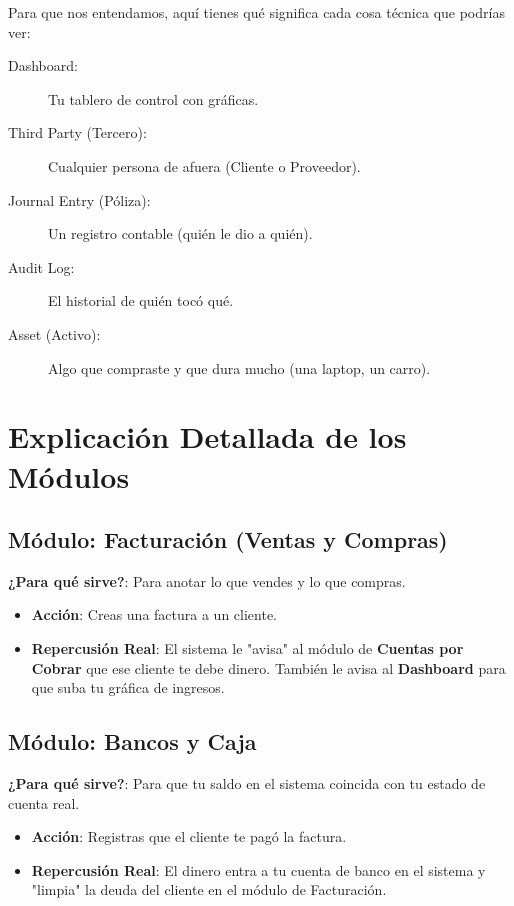 \documentclass[12pt, landscape, oneside]{book}
\begin{document}
Para que nos entendamos, aquí tienes qué significa cada cosa técnica que podrías ver:
\begin{description}
    \item[Dashboard:] Tu tablero de control con gráficas.
    \item[Third Party (Tercero):] Cualquier persona de afuera (Cliente o Proveedor).
    \item[Journal Entry (Póliza):] Un registro contable (quién le dio a quién).
    \item[Audit Log:] El historial de quién tocó qué.
    \item[Asset (Activo):] Algo que compraste y que dura mucho (una laptop, un carro).
\end{description}

\chapter{Explicación Detallada de los Módulos}

\section{Módulo: Facturación (Ventas y Compras)}
\textbf{¿Para qué sirve?}: Para anotar lo que vendes y lo que compras.
\begin{itemize}
    \item \textbf{Acción}: Creas una factura a un cliente.
    \item \textbf{Repercusión Real}: El sistema le "avisa" al módulo de \textbf{Cuentas por Cobrar} que ese cliente te debe dinero. También le avisa al \textbf{Dashboard} para que suba tu gráfica de ingresos.
\end{itemize}

\section{Módulo: Bancos y Caja}
\textbf{¿Para qué sirve?}: Para que tu saldo en el sistema coincida con tu estado de cuenta real.
\begin{itemize}
    \item \textbf{Acción}: Registras que el cliente te pagó la factura.
    \item \textbf{Repercusión Real}: El dinero entra a tu cuenta de banco en el sistema y "limpia" la deuda del cliente en el módulo de Facturación.
\end{itemize}
\end{document}

